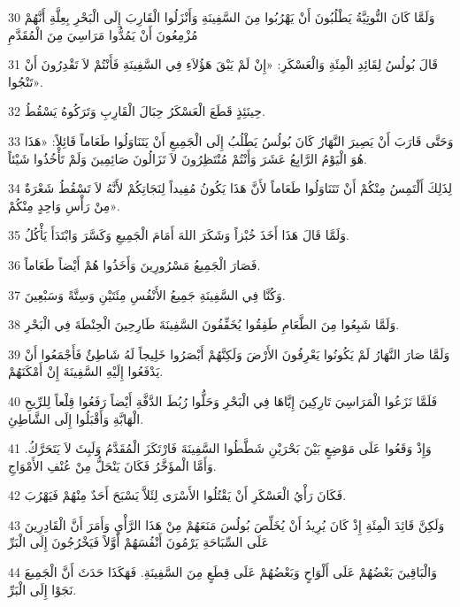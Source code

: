 \par 30 وَلَمَّا كَانَ النُّوتِيَّةُ يَطْلُبُونَ أَنْ يَهْرُبُوا مِنَ السَّفِينَةِ وَأَنْزَلُوا الْقَارِبَ إِلَى الْبَحْرِ بِعِلَّةِ أَنَّهُمْ مُزْمِعُونَ أَنْ يَمُدُّوا مَرَاسِيَ مِنَ الْمُقَدَّمِ
\par 31 قَالَ بُولُسُ لِقَائِدِ الْمِئَةِ وَالْعَسْكَرِ: «إِنْ لَمْ يَبْقَ هَؤُلاَءِ فِي السَّفِينَةِ فَأَنْتُمْ لاَ تَقْدِرُونَ أَنْ تَنْجُوا».
\par 32 حِينَئِذٍ قَطَعَ الْعَسْكَرُ حِبَالَ الْقَارِبِ وَتَرَكُوهُ يَسْقُطُ.
\par 33 وَحَتَّى قَارَبَ أَنْ يَصِيرَ النَّهَارُ كَانَ بُولُسُ يَطْلُبُ إِلَى الْجَمِيعِ أَنْ يَتَنَاوَلُوا طَعَاماً قَائِلاً: «هَذَا هُوَ الْيَوْمُ الرَّابِعُ عَشَرَ وَأَنْتُمْ مُنْتَظِرُونَ لاَ تَزَالُونَ صَائِمِينَ وَلَمْ تَأْخُذُوا شَيْئاً.
\par 34 لِذَلِكَ أَلْتَمِسُ مِنْكُمْ أَنْ تَتَنَاوَلُوا طَعَاماً لأَنَّ هَذَا يَكُونُ مُفِيداً لِنَجَاتِكُمْ لأَنَّهُ لاَ تَسْقُطُ شَعْرَةٌ مِنْ رَأْسِ وَاحِدٍ مِنْكُمْ».
\par 35 وَلَمَّا قَالَ هَذَا أَخَذَ خُبْزاً وَشَكَرَ اللهَ أَمَامَ الْجَمِيعِ وَكَسَّرَ وَابْتَدَأَ يَأْكُلُ.
\par 36 فَصَارَ الْجَمِيعُ مَسْرُورِينَ وَأَخَذُوا هُمْ أَيْضاً طَعَاماً.
\par 37 وَكُنَّا فِي السَّفِينَةِ جَمِيعُ الأَنْفُسِ مِئَتَيْنِ وَسِتَّةً وَسَبْعِينَ.
\par 38 وَلَمَّا شَبِعُوا مِنَ الطَّعَامِ طَفِقُوا يُخَفِّفُونَ السَّفِينَةَ طَارِحِينَ الْحِنْطَةَ فِي الْبَحْرِ.
\par 39 وَلَمَّا صَارَ النَّهَارُ لَمْ يَكُونُوا يَعْرِفُونَ الأَرْضَ وَلَكِنَّهُمْ أَبْصَرُوا خَلِيجاً لَهُ شَاطِئٌ فَأَجْمَعُوا أَنْ يَدْفَعُوا إِلَيْهِ السَّفِينَةَ إِنْ أَمْكَنَهُمْ.
\par 40 فَلَمَّا نَزَعُوا الْمَرَاسِيَ تَارِكِينَ إِيَّاهَا فِي الْبَحْرِ وَحَلُّوا رُبُطَ الدَّفَّةِ أَيْضاً رَفَعُوا قِلْعاً لِلرِّيحِ الْهَابَّةِ وَأَقْبَلُوا إِلَى الشَّاطِئِ.
\par 41 وَإِذْ وَقَعُوا عَلَى مَوْضِعٍ بَيْنَ بَحْرَيْنِ شَطَّطُوا السَّفِينَةَ فَارْتَكَزَ الْمُقَدَّمُ وَلَبِثَ لاَ يَتَحَرَّكُ. وَأَمَّا الْمؤَخَّرُ فَكَانَ يَنْحَلُّ مِنْ عُنْفِ الأَمْوَاجِ.
\par 42 فَكَانَ رَأْيُ الْعَسْكَرِ أَنْ يَقْتُلُوا الأَسْرَى لِئَلاَّ يَسْبَحَ أَحَدٌ مِنْهُمْ فَيَهْرُبَ.
\par 43 وَلَكِنَّ قَائِدَ الْمِئَةِ إِذْ كَانَ يُرِيدُ أَنْ يُخَلِّصَ بُولُسَ مَنَعَهُمْ مِنْ هَذَا الرَّأْيِ وَأَمَرَ أَنَّ الْقَادِرِينَ عَلَى السِّبَاحَةِ يَرْمُونَ أَنْفُسَهُمْ أَوَّلاً فَيَخْرُجُونَ إِلَى الْبَرِّ
\par 44 وَالْبَاقِينَ بَعْضُهُمْ عَلَى أَلْوَاحٍ وَبَعْضُهُمْ عَلَى قِطَعٍ مِنَ السَّفِينَةِ. فَهَكَذَا حَدَثَ أَنَّ الْجَمِيعَ نَجَوْا إِلَى الْبَرِّ.

